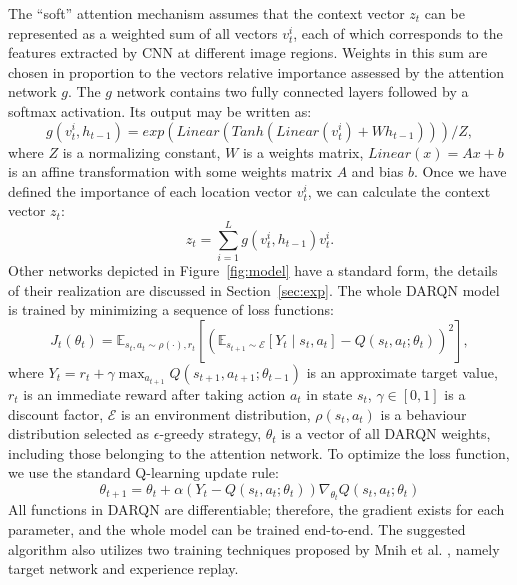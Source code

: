 \documentclass{article} \usepackage{nips15submit_e,times}
\begin{document}
The ``soft'' attention mechanism assumes that the context vector $z_t$ can be represented as a weighted sum of all vectors $v_t^i$, 
each of which corresponds to the features extracted by CNN at different image regions. Weights in this sum are chosen in proportion to the vectors relative importance assessed by the attention network $g$. The $g$ network contains two fully connected layers followed by a softmax activation. 
Its output may be written as:
\begin{equation}
	g(v_t^i, h_{t-1}) = exp(Linear(Tanh(Linear(v_t^i) + W h_{t-1})))/Z,
	\label{eq:att}
\end{equation}
where $Z$ is a normalizing constant, $W$ is a weights matrix, $Linear(x) = A x + b$ is an affine transformation with some weights matrix $A$ and bias $b$. 
Once we have defined the importance of each location vector $v_t^i$, we can calculate the context vector $z_t$:
\begin{equation}
	z_t = \sum_{i=1}^L g(v_t^i, h_{t-1})v_t^i.
    \label{eq:soft}
\end{equation}
Other networks depicted in Figure~\ref{fig:model} have a standard form, the details of their realization are discussed in Section~\ref{sec:exp}. 
The whole DARQN model is trained by minimizing a sequence of loss functions:
\begin{equation}
	J_t(\theta_t) = \mathbb{E}_{s_t,a_t\sim\rho(\cdot),r_t}[(\mathbb{E}_{s_{t+1}\sim\mathcal{E}}[Y_t\mid{s_t,a_t}] - Q(s_t,a_t;\theta_t))^2],
	\label{eq:loss1}
\end{equation}
where $Y_t = r_t + \gamma \max_{a_{t+1}}Q(s_{t+1},a_{t+1};\theta_{t-1})$ is an approximate target value, $r_t$ is an immediate reward after taking action $a_t$ in state $s_t$, $\gamma \in [0,1]$ is a discount factor, $\mathcal{E}$ is an environment distribution, $\rho(s_t,a_t)$ is a behaviour distribution selected as $\epsilon$-greedy strategy, $\theta_t$ is a vector of all DARQN weights, including those belonging to the attention network. To optimize the loss function, we use the standard Q-learning update rule:
\begin{equation}
	\theta_{t+1} = \theta_t + \alpha(Y_t - Q(s_t,a_t;\theta_t))\nabla_{\theta_t}Q(s_t,a_t;\theta_t)
    \label{eq:req}
\end{equation}
All functions in DARQN are differentiable; therefore, the gradient exists for each parameter, and the whole model can be trained end-to-end.  The suggested algorithm also utilizes two training techniques proposed by Mnih et al. \cite{mnih2015human}, namely target network and experience replay. \par
\end{document}

